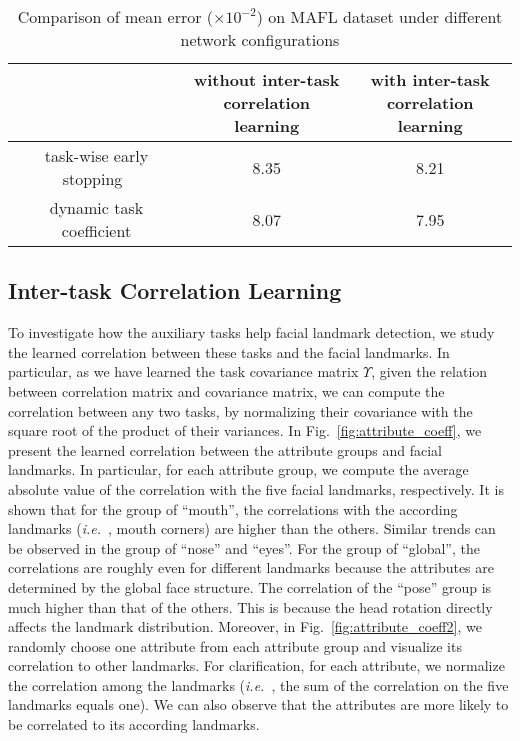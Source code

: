 \documentclass[10pt,journal,compsoc]{IEEEtran}
\newcommand{\ie}{\emph{i.e.}~}
\begin{document}
\begin{table}[t]
\caption{Comparison of mean error ($\times10^{-2}$) on MAFL dataset under different network configurations}
\vskip -0.35cm
\label{tab:conf}
\begin{center}
	\setlength{\tabcolsep}{.0667em}
\begin{tabular}{c|c|c}
\hline
&\parbox{2.5cm}{without inter-task\\correlation learning}&\parbox{2.5cm}{with inter-task\\correlation learning}\\
\hline\hline
task-wise early stopping~\cite{zhang2014facial}&8.35&8.21\\
dynamic task coefficient&8.07&7.95\\
\hline
\end{tabular}
\end{center}
\end{table}


\subsection{Inter-task Correlation Learning}
To investigate how the auxiliary tasks help facial landmark detection, we study the learned correlation between these tasks and the facial landmarks. In particular, as we have learned the task covariance matrix $\Upsilon$, given the relation between correlation matrix and covariance matrix, we can compute the correlation between any two tasks, by normalizing their covariance with the square root of the product of their variances. In Fig.~\ref{fig:attribute_coeff}, we present the learned correlation between the attribute groups and facial landmarks. In particular, for each attribute group, we compute the average absolute value of the correlation with the five facial landmarks, respectively. It is shown that for the group of ``mouth'', the correlations with the according landmarks (\ie, mouth corners) are higher than the others. Similar trends can be observed in the group of ``nose'' and ``eyes''. For the group of ``global'', the correlations are roughly even for different landmarks because the attributes are determined by the global face structure. The correlation of the ``pose'' group is much higher than that of the others. This is because the head rotation directly affects the landmark distribution. Moreover, in Fig.~\ref{fig:attribute_coeff2}, we randomly choose one attribute from each attribute group and visualize its correlation to other landmarks. For clarification, for each attribute, we normalize the correlation among the landmarks (\ie, the sum of the correlation on the five landmarks equals one). We can also observe that the attributes are more likely to be correlated to its according landmarks.
\end{document}

